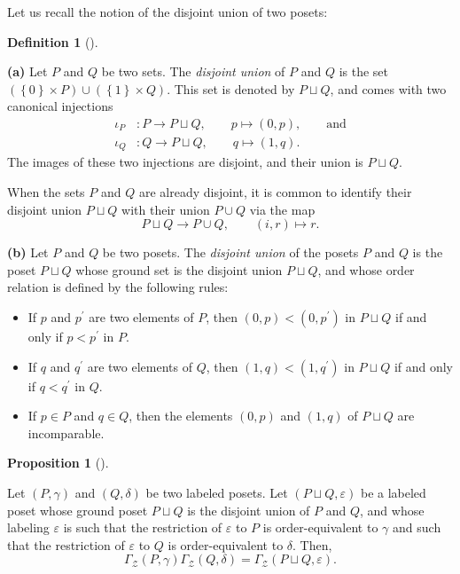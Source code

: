 \documentclass[numbers=enddot,12pt,final,onecolumn,notitlepage]{scrartcl}%
\theoremstyle{definition}
\newtheorem{prop}[theo]{Proposition}
\newenvironment{proposition}[1][]
{\begin{prop}[#1]\begin{leftbar}}
{\end{leftbar}\end{prop}}
\newtheorem{defi}[theo]{Definition}
\newenvironment{definition}[1][]
{\begin{defi}[#1]\begin{leftbar}}
{\end{leftbar}\end{defi}}
\begin{document}
Let us recall the notion of the disjoint union of two posets:

\begin{definition}
\textbf{(a)} Let $P$ and $Q$ be two sets.
The \textit{disjoint union} of $P$ and $Q$ is the set
$\left( \left\{0\right\} \times P \right)
              \cup \left( \left\{1\right\} \times Q \right)$.
This set is denoted by $P \sqcup Q$,
and comes with two canonical injections
\begin{align*}
\iota_P &: P \to P \sqcup Q, \qquad  p \mapsto \left(0, p\right), \qquad \text{and} \\
\iota_Q &: Q \to P \sqcup Q, \qquad  q \mapsto \left(1, q\right).
\end{align*}
The images of these two injections are disjoint, and their
union is $P \sqcup Q$.

When the sets $P$ and $Q$ are already disjoint, it is common
to identify their disjoint union $P \sqcup Q$ with their
union $P \cup Q$ via the map
\[
P \sqcup Q \to P \cup Q, \qquad \left(i, r\right) \mapsto r .
\]

\textbf{(b)} Let $P$ and $Q$ be two posets.
The \textit{disjoint union} of the posets $P$ and $Q$ is the poset
$P \sqcup Q$ whose ground set is the disjoint union $P \sqcup Q$,
and whose order relation is defined by the following rules:
\begin{itemize}
\item If $p$ and $p^{\prime}$ are two elements of $P$, then
      $\left(0, p\right) < \left(0, p^{\prime}\right)$ in $P \sqcup Q$
      if and only if $p < p^{\prime}$ in $P$.
\item If $q$ and $q^{\prime}$ are two elements of $Q$, then
      $\left(1, q\right) < \left(1, q^{\prime}\right)$ in $P \sqcup Q$
      if and only if $q < q^{\prime}$ in $Q$.
\item If $p \in P$ and $q \in Q$,
      then the elements $\left(0, p\right)$ and $\left(1, q\right)$
      of $P \sqcup Q$ are incomparable.
\end{itemize}
\end{definition}

\begin{proposition}
\label{prop.prod1}Let $\left(  P,\gamma\right)  $ and $\left(  Q,\delta
\right)  $ be two labeled posets. Let $\left(  P\sqcup Q,\varepsilon\right)  $
be a labeled poset whose ground poset $P\sqcup Q$ is the disjoint union of $P$
and $Q$, and whose labeling $\varepsilon$ is such that the restriction of
$\varepsilon$ to $P$ is order-equivalent to $\gamma$ and such that the
restriction of $\varepsilon$ to $Q$ is order-equivalent to $\delta$. Then,%
\[
\Gamma_{\mathcal{Z}}\left(  P,\gamma\right)  \Gamma_{\mathcal{Z}}\left(
Q,\delta\right)  =\Gamma_{\mathcal{Z}}\left(  P\sqcup Q,\varepsilon\right)  .
\]

\end{proposition}
\end{document}
